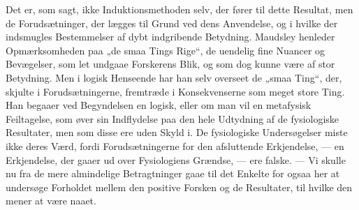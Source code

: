 \documentclass[12pt,a4paper,openany]{book}
\begin{document}
Det er, som sagt, ikke Induktionsmethoden selv, der
fører til dette Resultat, men de Forudsætninger, der lægges til
Grund ved dens Anvendelse, og i hvilke der indsmugles
Bestemmelser af dybt indgribende Betydning. Maudsley
henleder Opmærksomheden paa „de smaa Tings Rige“, de
uendelig fine Nuancer og Bevægelser, som let undgaae Forskerens
Blik, og som dog kunne være af stor Betydning. Men
i logisk Henseende har han selv overseet de „smaa Ting“,
der, skjulte i Forudsætningerne, fremtræde i Konsekvenserne
som meget store Ting. Han begaaer ved Begyndelsen en
logisk, eller om man vil en metafysisk Feiltagelse, som øver
sin Indflydelse paa den hele Udtydning af de fysiologiske
Resultater, men som disse ere uden Skyld i. De fysiologiske
Undersøgelser miste ikke deres Værd, fordi Forudsætningerne
for den afsluttende Erkjendelse, --- en Erkjendelse, der gaaer
ud over Fysiologiens Grændse, --- ere falske. --- Vi skulle
nu fra de mere almindelige Betragtninger gaae til det Enkelte
for ogsaa her at undersøge Forholdet mellem den
positive Forsken og de Resultater, til hvilke den mener at
være naaet.
\end{document}
